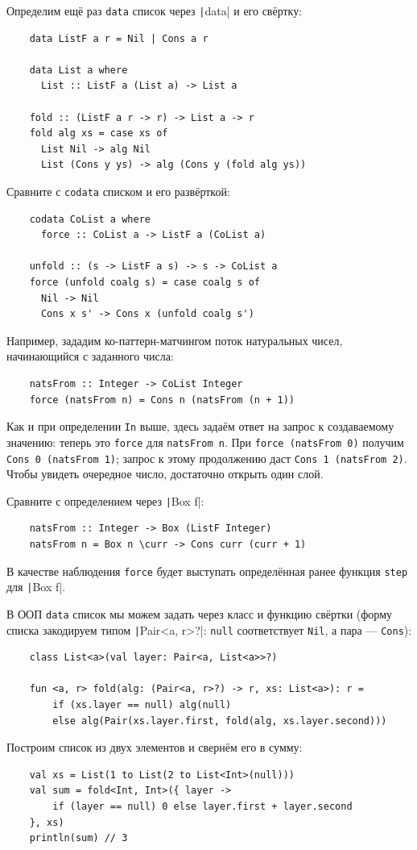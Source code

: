 Определим ещё раз \texttt{data} список через \texttt|data| и его свёртку:
\begin{verbatim}
    data ListF a r = Nil | Cons a r

    data List a where
      List :: ListF a (List a) -> List a

    fold :: (ListF a r -> r) -> List a -> r
    fold alg xs = case xs of
      List Nil -> alg Nil
      List (Cons y ys) -> alg (Cons y (fold alg ys))
\end{verbatim}
Сравните с \texttt{codata} списком и его развёрткой:
\begin{verbatim}
    codata CoList a where
      force :: CoList a -> ListF a (CoList a)

    unfold :: (s -> ListF a s) -> s -> CoList a
    force (unfold coalg s) = case coalg s of
      Nil -> Nil
      Cons x s' -> Cons x (unfold coalg s')
\end{verbatim}

Например, зададим ко-паттерн-матчингом поток натуральных чисел, начинающийся с заданного числа:
\begin{verbatim}
    natsFrom :: Integer -> CoList Integer
    force (natsFrom n) = Cons n (natsFrom (n + 1))
\end{verbatim}
Как и при определении \texttt{In} выше, здесь задаём ответ на запрос к создаваемому значению: теперь это \texttt{force} для \texttt{natsFrom n}.
При \texttt{force (natsFrom 0)} получим \texttt{Cons 0 (natsFrom 1)}; запрос к этому продолжению даст \texttt{Cons 1 (natsFrom 2)}.
Чтобы увидеть очередное число, достаточно открыть один слой.

Сравните с определением через \texttt|Box f|:
\begin{verbatim}
    natsFrom :: Integer -> Box (ListF Integer)
    natsFrom n = Box n \curr -> Cons curr (curr + 1)
\end{verbatim}
В качестве наблюдения \texttt{force} будет выступать определённая ранее функция \texttt{step} для \texttt|Box f|.

В ООП \texttt{data} список мы можем задать через класс и функцию свёртки (форму списка закодируем типом \texttt|Pair<a, r>?|: \texttt{null} соответствует \texttt{Nil}, а пара --- \texttt{Cons}):
\begin{verbatim}
    class List<a>(val layer: Pair<a, List<a>>?)

    fun <a, r> fold(alg: (Pair<a, r>?) -> r, xs: List<a>): r =
        if (xs.layer == null) alg(null)
        else alg(Pair(xs.layer.first, fold(alg, xs.layer.second)))
\end{verbatim}
Построим список из двух элементов и свернём его в сумму:
\begin{verbatim}
    val xs = List(1 to List(2 to List<Int>(null)))
    val sum = fold<Int, Int>({ layer ->
        if (layer == null) 0 else layer.first + layer.second
    }, xs)
    println(sum) // 3
\end{verbatim}

